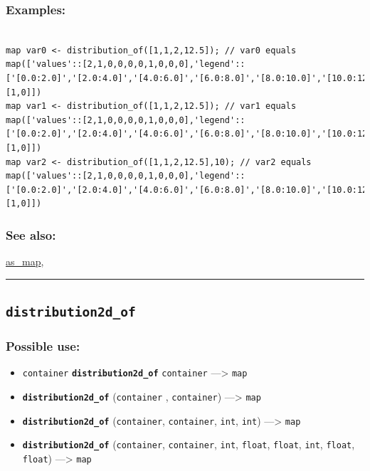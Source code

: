 \documentclass[]{book}
\providecommand{\tightlist}{%
  \setlength{\itemsep}{0pt}\setlength{\parskip}{0pt}}
\theoremstyle{definition}
\theoremstyle{definition}
\theoremstyle{definition}
\theoremstyle{remark}
\begin{document}
\subsubsection{Examples:}\label{examples-105}

\begin{verbatim}
 
map var0 <- distribution_of([1,1,2,12.5]); // var0 equals map(['values'::[2,1,0,0,0,0,1,0,0,0],'legend'::['[0.0:2.0]','[2.0:4.0]','[4.0:6.0]','[6.0:8.0]','[8.0:10.0]','[10.0:12.0]','[12.0:14.0]','[14.0:16.0]','[16.0:18.0]','[18.0:20.0]'],'parlist'::[1,0]]) 
map var1 <- distribution_of([1,1,2,12.5]); // var1 equals map(['values'::[2,1,0,0,0,0,1,0,0,0],'legend'::['[0.0:2.0]','[2.0:4.0]','[4.0:6.0]','[6.0:8.0]','[8.0:10.0]','[10.0:12.0]','[12.0:14.0]','[14.0:16.0]','[16.0:18.0]','[18.0:20.0]'],'parlist'::[1,0]]) 
map var2 <- distribution_of([1,1,2,12.5],10); // var2 equals map(['values'::[2,1,0,0,0,0,1,0,0,0],'legend'::['[0.0:2.0]','[2.0:4.0]','[4.0:6.0]','[6.0:8.0]','[8.0:10.0]','[10.0:12.0]','[12.0:14.0]','[14.0:16.0]','[16.0:18.0]','[18.0:20.0]'],'parlist'::[1,0]])
\end{verbatim}

\subsubsection{See also:}\label{see-also-82}

\href{operators-a-to-a.html\#as_map}{as\_map},

\begin{center}\rule{0.5\linewidth}{\linethickness}\end{center}

\subsection{\texorpdfstring{\texttt{distribution2d\_of}}{distribution2d\_of}}\label{distribution2d_of}

\subsubsection{Possible use:}\label{possible-use-139}

\begin{itemize}
\tightlist
\item
  \texttt{container} \textbf{\texttt{distribution2d\_of}}
  \texttt{container} ---\textgreater{} \texttt{map}
\item
  \textbf{\texttt{distribution2d\_of}} (\texttt{container} ,
  \texttt{container}) ---\textgreater{} \texttt{map}
\item
  \textbf{\texttt{distribution2d\_of}} (\texttt{container},
  \texttt{container}, \texttt{int}, \texttt{int}) ---\textgreater{}
  \texttt{map}
\item
  \textbf{\texttt{distribution2d\_of}} (\texttt{container},
  \texttt{container}, \texttt{int}, \texttt{float}, \texttt{float},
  \texttt{int}, \texttt{float}, \texttt{float}) ---\textgreater{}
  \texttt{map}
\end{itemize}
\end{document}
